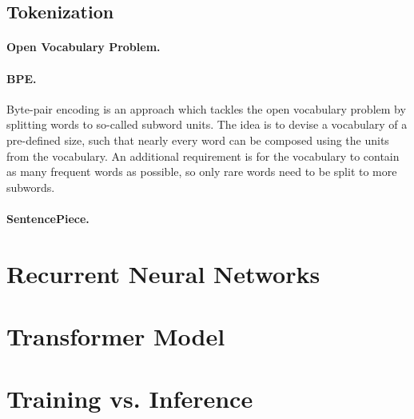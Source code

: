 \subsection{Tokenization}


\paragraph{Open Vocabulary Problem.}



\paragraph{BPE.}
Byte-pair encoding \citep{sennrich2016bpe} is an approach which tackles the
open vocabulary problem by splitting words to so-called subword units.  The
idea is to devise a vocabulary of a pre-defined size, such that nearly every
word can be composed using the units from the vocabulary. An additional
requirement is for the vocabulary to contain as many frequent words as
possible, so only rare words need to be split to more subwords.


\paragraph{SentencePiece.}


\section{Recurrent Neural Networks}

\section{Transformer Model}


\section{Training vs. Inference}










\begin{markdown}

\end{markdown}